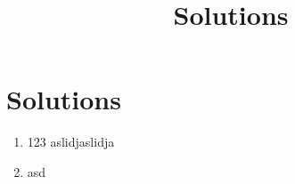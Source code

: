 \documentclass{article}
\begin{document}


\section*{Solutions}
\title{Solutions}
\begin{enumerate}
        \item 123
aslidjaslidja
        \item asd

\end{enumerate}
\end{document}
